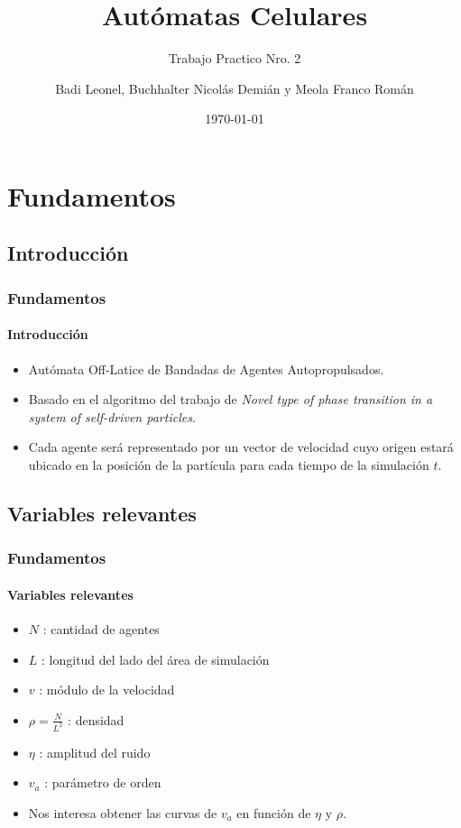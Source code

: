 \documentclass[hyperref={pdfpagelayout=SinglePage}]{beamer}
\title{Autómatas Celulares}
\subtitle{Trabajo Practico Nro. 2}
\author{Badi Leonel, Buchhalter Nicolás Demián y Meola Franco Román}
\date{\today}
\begin{document}
\renewcommand{\figurename}{Grafico}

\begin{frame}[plain]
    \frametitle{} 
    \titlepage
\end{frame}

\section{Fundamentos}

\subsection{Introducción}

\begin{frame}
\frametitle{Fundamentos}
\framesubtitle{Introducción}
\begin{itemize}
	\item Autómata Off-Latice de Bandadas de Agentes Autopropulsados.
	\item Basado en el algoritmo del trabajo de \textit{Novel type of phase transition in a system of self-driven particles}.
	\item Cada agente será representado por un vector de velocidad cuyo origen estará ubicado en la posición de la partícula para cada tiempo de la simulación $t$.
\end{itemize}
\end{frame}

\subsection{Variables relevantes}

\begin{frame}
\frametitle{Fundamentos}
\framesubtitle{Variables relevantes}
\begin{itemize}
	\item $N$ : cantidad de agentes
	\item $L$ : longitud del lado del área de simulación
	\item $v$ : módulo de la velocidad
	\item $\rho = \frac{N}{L^2}$ : densidad
	\item $\eta$ : amplitud del ruido
	\item $v_{a}$ : parámetro de orden
	\item Nos interesa obtener las curvas de  $v_{a}$ en función de $\eta$ y $\rho$.
\end{itemize}
\end{frame}
\end{document}
